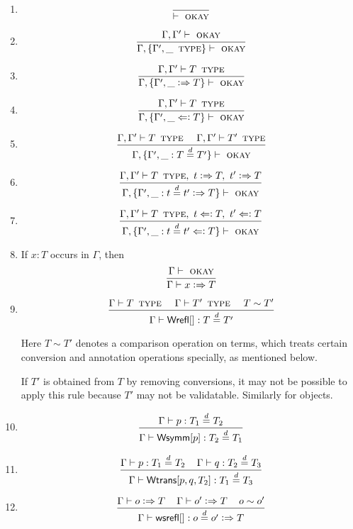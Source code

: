 \documentclass[11pt]{article}
\newcommand{\eqd}{\stackrel{d}{=}}
\newcommand{\spc}{{\,\,\,\,\,\,\,}}
\newcommand{\synth}{\vcentcolon\Rightarrow}
\newcommand{\ccheck}{\Leftarrow\vcentcolon}
\newcommand{\Type}{\mathop{\text{ \sc type}}}
\newcommand{\Okay}{\mathop{\text{ \sc okay}}}
\newcommand{\ha}[2]{#1[#2]}
\newcommand{\Wrefl}{{\sf Wrefl}}
\newcommand{\Wtrans}{{\sf Wtrans}}
\newcommand{\Wsymm}{{\sf Wsymm}}
\newcommand{\wsrefl}{{\sf wsrefl}}
\newcommand{\var}{\char`_}
\begin{document}
\begin{enumerate}

\item
$$\frac{}{\vdash\Okay}$$

\item
$$\frac{\Gamma,\Gamma'\vdash \Okay}{\Gamma,\{\Gamma',\var \Type \} \vdash\Okay}$$

\item
$$\frac{\Gamma,\Gamma'\vdash T \Type}{\Gamma,\{\Gamma',\var \synth T \} \vdash\Okay}$$

\item
$$\frac{\Gamma,\Gamma'\vdash T \Type}{\Gamma,\{\Gamma',\var \ccheck T \} \vdash\Okay}$$

\item
$$\frac{\Gamma,\Gamma'\vdash T \Type \spc \Gamma,\Gamma'\vdash T' \Type}{\Gamma,\{\Gamma',\var : T \eqd T' \} \vdash\Okay}$$

\item
$$\frac{\Gamma,\Gamma'\vdash T \Type,~ t \synth T,~ t' \synth T}{\Gamma,\{\Gamma',\var : t \eqd t' \synth T \} \vdash\Okay}$$

\item
$$\frac{\Gamma,\Gamma'\vdash T \Type,~ t \ccheck T,~ t' \ccheck T}{\Gamma,\{\Gamma',\var : t \eqd t' \ccheck T \} \vdash\Okay}$$



\item 
If $x:T$ occurs in $\Gamma$, then
$$\frac{\Gamma\vdash\Okay}{\Gamma\vdash x \synth T}$$

\item 
$$\frac{\Gamma \vdash T \Type\spc \Gamma \vdash T'\Type \spc T\sim T'}{\Gamma\vdash \ha\Wrefl{}: T\eqd T'}$$

Here $T\sim T'$ denotes a comparison operation on terms, which treats certain
conversion and annotation operations specially, as mentioned below.

If $T'$ is obtained from $T$ by removing conversions, it may not be possible to apply
this rule because $T'$ may not be validatable.  Similarly for objects.

\item 
$$\frac{\Gamma\vdash p:T_1\eqd T_2}{\Gamma\vdash \ha\Wsymm{p}:T_2\eqd T_1}$$

\item 
$$\frac{\Gamma\vdash p:T_1\eqd T_2\spc\Gamma\vdash q:T_2\eqd T_3}{\Gamma\vdash \ha\Wtrans{p,q,T_2}: T_1\eqd T_3}$$

\item 
$$\frac{\Gamma\vdash o \synth T\spc\Gamma\vdash o' \synth T \spc o \sim o'}{\Gamma\vdash \ha\wsrefl{}:o\eqd o' \synth T}$$


\end{enumerate}
\end{document}

